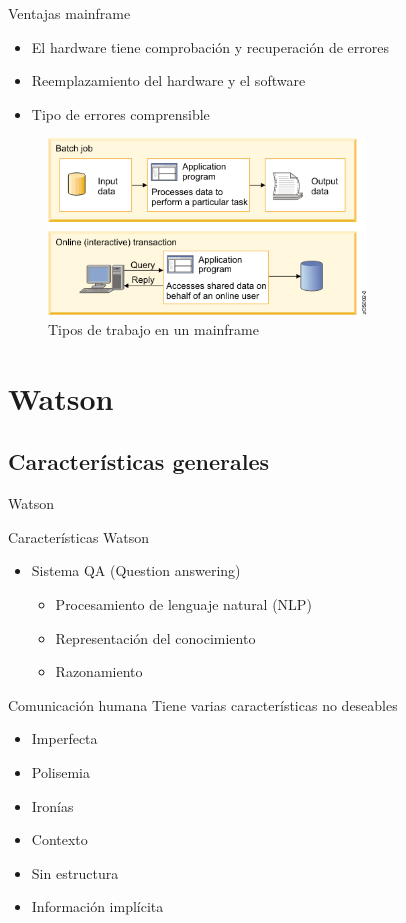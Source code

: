 \documentclass[compress]{beamer}
\begin{document}
\begin{frame}
	\begin{block}{Ventajas mainframe}
		\begin{itemize}
			\item El hardware tiene comprobación y recuperación de errores
			\item Reemplazamiento del hardware y el software
			\item Tipo de errores comprensible
		\end{itemize}
	\end{block}
	\begin{figure}[H]
		\centering
		\label{workloads}
		\includegraphics[trim = 0mm 0mm 5mm 0mm, clip, width=0.75\textwidth]{./Imagenes/workloads.png}
		\caption{Tipos de trabajo en un mainframe}
	\end{figure}
\end{frame}

\section{Watson}
\subsection{Características generales}
\begin{frame}{Watson}
	\begin{block}{Características Watson}
		\begin{itemize}
			\item Sistema QA (Question answering)
			\begin{itemize}
				\item Procesamiento
				de lenguaje natural (NLP)	
				\item Representación del conocimiento
				\item Razonamiento
			\end{itemize}
		\end{itemize}
	\end{block}
	\begin{block}{Comunicación humana}
		Tiene varias características no deseables
		\begin{itemize}
			\item Imperfecta
			\item Polisemia
			\item Ironías
			\item Contexto
			\item Sin estructura
			\item Información implícita
		\end{itemize}
	\end{block}
\end{frame}
\end{document}
